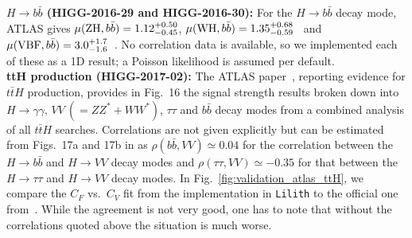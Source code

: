 
{\bf\boldmath $H\to b\bar b$ (HIGG-2016-29 and HIGG-2016-30):} For the $H\to b\bar b$ decay mode, ATLAS gives 
$\mu({\rm ZH}, b\bar b) = 1.12^{+0.50}_{-0.45}$, $\mu({\rm WH}, b\bar b) = 1.35^{+0.68}_{-0.59}$~\cite{Aaboud:2018gay} 
and $\mu({\rm VBF}, b\bar b) = 3.0^{+1.7}_{-1.6}$~\cite{Aaboud:2018gay}. 
No correlation data is available, so we implemented each of these as a 1D result; 
a Poisson likelihood is assumed per default. \\


{\bf\boldmath ttH production (HIGG-2017-02):} The ATLAS paper~\cite{Aaboud:2017jvq}, reporting evidence for $t\bar tH$ production,  
provides in Fig.~16 the signal strength results broken down into $H\to \gamma\gamma$, $VV~(=ZZ^*+WW^*)$, $\tau\tau$ and $b\bar b$ 
decay modes from a combined analysis of all $t\bar tH$ searches.  
Correlations are not given explicitly but can be estimated from %
Figs.~17a and 17b in \cite{Aaboud:2017jvq} 
as $\rho(b\bar b, VV)\simeq 0.04$ for the correlation between the $H\to b\bar b$ and $H\to VV$ decay modes
and $\rho(\tau\tau, VV)\simeq -0.35$ for that between the $H\to \tau\tau$ and $H\to VV$ decay modes. 
In Fig.~\ref{fig:validation_atlas_ttH}, we compare the $C_F$ vs.\ $C_V$ fit from the implementation in {\tt Lilith} 
to the official one from~\cite{Aaboud:2017jvq}. While the agreement is not very good,  
one has to note that without the correlations quoted above the situation is much worse. 

